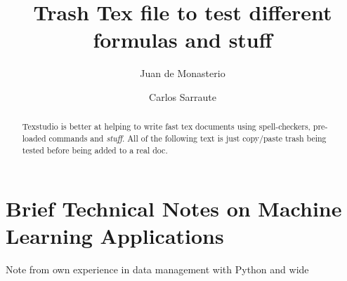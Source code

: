 \documentclass{article}%
\newcommand{\Expect}{{\mathbb{E}}}
\newtheorem{definition}{Definition}[subsection]
\theoremstyle{definition}
\begin{document}
\title{Trash Tex file to test different formulas and stuff}




\author{
	Juan de Monasterio
	\and Carlos Sarraute
}

%
%


\maketitle
\begin{abstract}
	
	Texstudio is better at helping to write fast tex documents using spell-checkers, pre-loaded commands and \textit{stuff}. All of the following text is just copy/paste trash being tested before being added to a real doc.
	



\end{abstract} 

\section{Brief Technical Notes on Machine Learning Applications}\label{section-technicalObservations}
Note from own experience  in data management with Python and wide 
\end{document}
